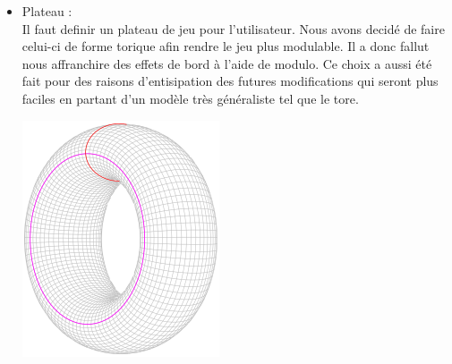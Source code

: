 \documentclass{article}
\begin{document}
\begin{itemize}
\begin{itemize}
\begin{center}
\begin{multicols}{2}
        \end{multicols}
        \end{center} 
        Le type de couleur de la case :
        \begin{center}
            NO-COLOR \hspace{1cm} WHITE \hspace{1cm} BLACK \\
        \end{center}
        L'occupant de la case :
        \begin{center}
            NO-SORT \hspace{2cm} SIMPLE-PAWN \\ 
        \end{center}
        Cette catégorie est voué à s'agrandir au vu de l'ajout de différentes sorte de pions par la suite. \\
        Egalement 
        \item Plateau : 
        \\
        Il faut definir un plateau de jeu pour l'utilisateur. Nous avons decidé de faire celui-ci de forme torique afin rendre le jeu plus modulable. Il a donc fallut nous affranchire des effets de bord à l'aide de modulo. Ce choix a aussi été fait pour des raisons d'entisipation des futures modifications qui seront plus faciles en partant d'un modèle très généraliste tel que le tore.\\
        \begin{center}
        \includegraphics[scale=0.3]{tor.png}
        \end{center}
        

\end{itemize}
\end{itemize}
\end{document}
